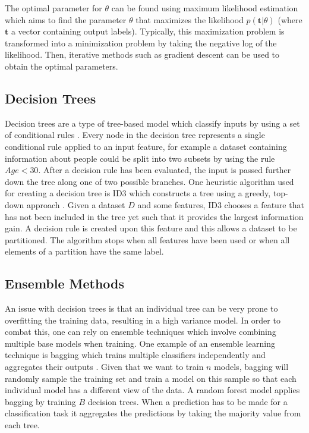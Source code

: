 \documentclass[../main.tex]{subfiles}
\begin{document}
The optimal parameter for $\theta$ can be found using maximum likelihood estimation which aims to find the parameter $\theta$ that maximizes the likelihood $p(\textbf{t}|\theta)$ (where $\textbf{t}$ a vector containing output labels). Typically, this maximization problem is transformed into a minimization problem by taking the negative log of the likelihood. Then, iterative methods such as gradient descent can be used to obtain the optimal parameters. 


\subsection{Decision Trees}

Decision trees are a type of tree-based model which classify inputs by using a set of conditional rules \cite{grzymala1993selected}. Every node in the decision tree represents a single conditional rule applied to an input feature, for example a dataset containing information about people could be split into two subsets by using the rule $Age < 30$. After a decision rule has been evaluated, the input is passed further down the tree along one of two possible branches. One heuristic algorithm used for creating a decision tree is ID3 which constructs a tree using a greedy, top-down approach \cite{quinlan1986induction}. Given a dataset $D$ and some features, ID3 chooses a feature that has not been included in the tree yet such that it provides the largest information gain. A decision rule is created upon this feature and this allows a dataset to be partitioned. The algorithm stops when all features have been used or when all elements of a partition have the same label. 
 
\subsection{Ensemble Methods}

An issue with decision trees is that an individual tree can be very prone to overfitting the training data, resulting in a high variance model. In order to combat this, one can rely on ensemble techniques which involve combining multiple base models when training. One example of an ensemble learning technique is bagging which trains multiple classifiers independently and aggregates their outputs \cite{breiman1996bagging}. Given that we want to train $n$ models, bagging will randomly sample the training set and train a model on this sample so that each individual model has a different view of the data. A random forest model applies bagging by training $B$ decision trees. When a prediction has to be made for a classification task it aggregates the predictions by taking the majority value from each tree. 
\end{document}
